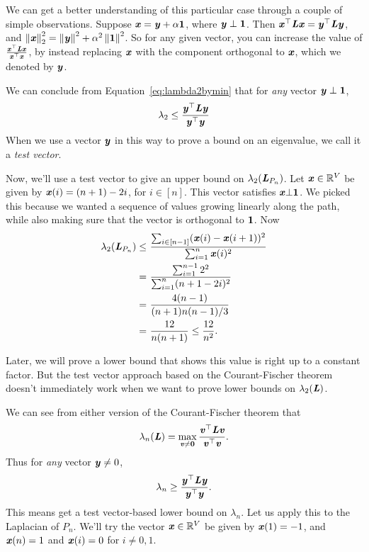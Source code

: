 We can get a better understanding of this particular case through a couple of simple
observations. Suppose $\boldsymbol{\mathit{x}} = \boldsymbol{\mathit{y}} + \alpha \boldsymbol{1}$, where $\boldsymbol{\mathit{y}} \perp
\boldsymbol{1}$.
Then $\boldsymbol{\mathit{x}}^{\top} \boldsymbol{\mathit{L}} \boldsymbol{\mathit{x}} = \boldsymbol{\mathit{y}}^{\top} \boldsymbol{\mathit{L}} \boldsymbol{\mathit{y}}$, and $\left\| \boldsymbol{\mathit{x}} \right\|_2^2 =
\left\| \boldsymbol{\mathit{y}} \right\|^2 + \alpha^2 \left\| \boldsymbol{1} \right\|^2$.
So for any given vector, you can increase the value of $\frac{
  \boldsymbol{\mathit{x}}^\top \boldsymbol{\mathit{L}} \boldsymbol{\mathit{x}}}{ \boldsymbol{\mathit{x}}^\top \boldsymbol{\mathit{x}}}$, by instead replacing $\boldsymbol{\mathit{x}}$ with
the component orthogonal to $\boldsymbol{\mathit{x}}$, which we denoted by $\boldsymbol{\mathit{y}}$.

We can conclude from Equation~\eqref{eq:lambda2bymin} that for \emph{any} vector $\boldsymbol{\mathit{y}} \perp \boldsymbol{1}$,
\begin{align*}
\lambda_2 \leq \frac{ \boldsymbol{\mathit{y}}^\top \boldsymbol{\mathit{L}} \boldsymbol{\mathit{y}}}{ \boldsymbol{\mathit{y}}^\top \boldsymbol{\mathit{y}}}
\end{align*}
When we use a vector $\boldsymbol{\mathit{y}}$ in this way to prove a bound on an eigenvalue, we call it a \emph{test vector}.

Now, we'll use a test vector to give an upper bound on $\lambda_2(\boldsymbol{\mathit{L}}_{P_n})$.
Let $\boldsymbol{\mathit{x}} \in \mathbb{R}^V$ be given by $\boldsymbol{\mathit{x}} ( i ) = ( n + 1 ) - 2 i$, for $i
\in [n]$. This vector satisfies $\boldsymbol{\mathit{x}} \bot \boldsymbol{1}$.
We picked this because we wanted a sequence of values growing linearly along
the path, while also making sure that the vector is orthogonal to
$\boldsymbol{1}$.
Now
\begin{align*}
\lambda_2(\boldsymbol{\mathit{L}}_{P_n})
\leq & ~ \frac{ \sum_{i \in [n-1]} ( \boldsymbol{\mathit{x}}(i) - \boldsymbol{\mathit{x}}(i+1) )^2  }{ \sum_{i=1}^n \boldsymbol{\mathit{x}}(i)^2 } \\
= & ~ \frac{ \sum_{i=1}^{n-1} 2^2 }{ \sum_{i=1}^n ( n + 1 - 2 i )^2 } \\
= & ~ \frac{ 4 ( n - 1 ) }{ ( n + 1 ) n ( n - 1 ) / 3 } \\
= & ~ \frac{ 12 } { n ( n + 1 ) } \leq \frac{ 12 } { n^2 }.
\end{align*}

Later, we will prove a lower bound that shows this value is right up
to a constant factor.
But the test vector approach based on the Courant-Fischer theorem
doesn't immediately work
when we want to prove lower bounds on $\lambda_2(\boldsymbol{\mathit{L}})$.

We can see from either version of the Courant-Fischer theorem that
\begin{align}
  \label{eq:lambda2bymin}
\lambda_n(\LL) = \max_{ \substack{ \vv \neq \veczero} } \frac{ \vv^\top \LL \vv}{ \vv^\top \vv}.
\end{align}
Thus for \emph{any} vector $\boldsymbol{\mathit{y}} \neq 0$,
\begin{align*}
\lambda_n \geq \frac{ \boldsymbol{\mathit{y}}^\top \boldsymbol{\mathit{L}} \boldsymbol{\mathit{y}}}{ \boldsymbol{\mathit{y}}^\top \boldsymbol{\mathit{y}}}.
\end{align*}
This means get a test vector-based lower bound on $\lambda_n$.
Let us apply this to the Laplacian of $P_n$.
We'll try the vector $\boldsymbol{\mathit{x}} \in \mathbb{R}^V$ be given by $\boldsymbol{\mathit{x}} ( 1 ) = -1$,
and $\boldsymbol{\mathit{x}}(n) = 1$ and $\boldsymbol{\mathit{x}}(i) = 0$ for $i \neq 0,1$.

